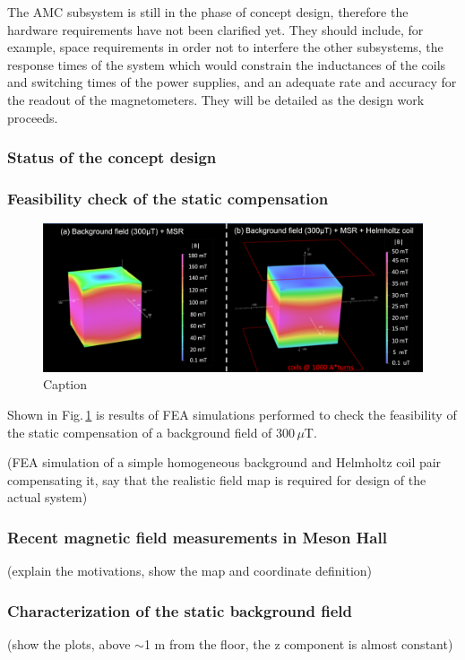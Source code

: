 The AMC subsystem is still in the phase of concept design, therefore  the hardware requirements have not been clarified yet. 
They should include, for example, space requirements in order not to interfere the other subsystems, the response times of the system which would constrain the inductances of the coils and switching times of the power supplies, and an adequate rate and accuracy for the readout of the magnetometers. They will be detailed as the design work proceeds. 


\subsubsection{Status of the concept design}
\subsubsection*{Feasibility check of the static compensation}
\begin{figure}[htb]
    \centering
    \includegraphics[width=\textwidth]{graphics/AMC/feasibility.png}
    \caption{Caption}
    \label{fig:amc_feasibility}
\end{figure}
Shown in Fig.\,\ref{fig:amc_feasibility} is results of FEA simulations performed to check the feasibility of the static compensation of a background field of $300\,\mu$T. 


(FEA simulation of a simple homogeneous background and Helmholtz coil pair compensating it, say that the realistic field map is required for design of the actual system)

\subsubsection*{Recent magnetic field measurements in Meson Hall}\label{sec:amc_recent}
(explain the motivations, show the map and coordinate definition)
\subsubsection*{Characterization of the static background field}
(show the plots, above $\sim$1 m from the floor, the z component is almost constant)
